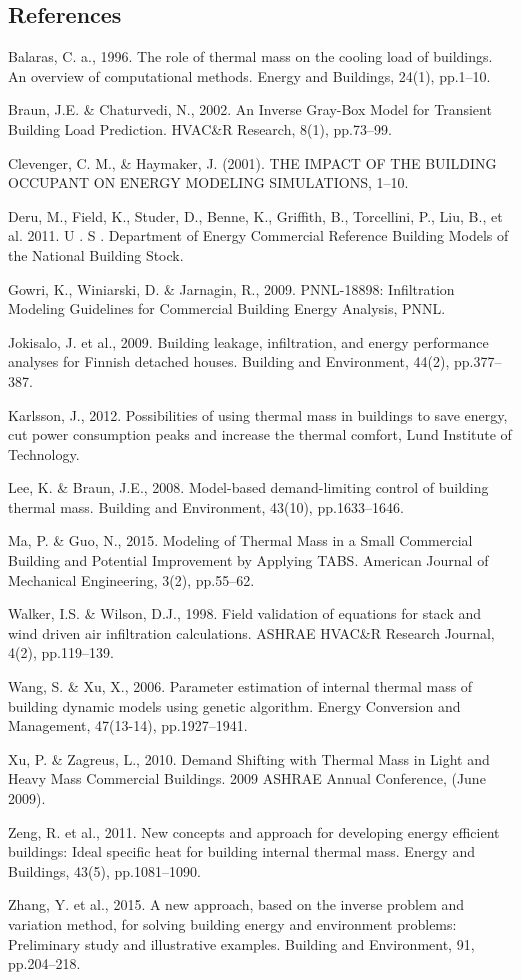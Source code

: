 \subsection{References}\label{references}

Balaras, C. a., 1996. The role of thermal mass on the cooling load of buildings. An overview of computational methods. Energy and Buildings, 24(1), pp.1–10.

Braun, J.E. \& Chaturvedi, N., 2002. An Inverse Gray-Box Model for Transient Building Load Prediction. HVAC\&R Research, 8(1), pp.73–99.

Clevenger, C. M., \& Haymaker, J. (2001). THE IMPACT OF THE BUILDING OCCUPANT ON ENERGY MODELING SIMULATIONS, 1–10.

Deru, M., Field, K., Studer, D., Benne, K., Griffith, B., Torcellini, P., Liu, B., et al. 2011. U . S . Department of Energy Commercial Reference Building Models of the National Building Stock.

Gowri, K., Winiarski, D. \& Jarnagin, R., 2009. PNNL-18898: Infiltration Modeling Guidelines for Commercial Building Energy Analysis, PNNL.

Jokisalo, J. et al., 2009. Building leakage, infiltration, and energy performance analyses for Finnish detached houses. Building and Environment, 44(2), pp.377–387.

Karlsson, J., 2012. Possibilities of using thermal mass in buildings to save energy, cut power consumption peaks and increase the thermal comfort, Lund Institute of Technology.

Lee, K. \& Braun, J.E., 2008. Model-based demand-limiting control of building thermal mass. Building and Environment, 43(10), pp.1633–1646.

Ma, P. \& Guo, N., 2015. Modeling of Thermal Mass in a Small Commercial Building and Potential Improvement by Applying TABS. American Journal of Mechanical Engineering, 3(2), pp.55–62.

Walker, I.S. \& Wilson, D.J., 1998. Field validation of equations for stack and wind driven air infiltration calculations. ASHRAE HVAC\&R Research Journal, 4(2), pp.119–139.

Wang, S. \& Xu, X., 2006. Parameter estimation of internal thermal mass of building dynamic models using genetic algorithm. Energy Conversion and Management, 47(13-14), pp.1927–1941.

Xu, P. \& Zagreus, L., 2010. Demand Shifting with Thermal Mass in Light and Heavy Mass Commercial Buildings. 2009 ASHRAE Annual Conference, (June 2009).

Zeng, R. et al., 2011. New concepts and approach for developing energy efficient buildings: Ideal specific heat for building internal thermal mass. Energy and Buildings, 43(5), pp.1081–1090.

Zhang, Y. et al., 2015. A new approach, based on the inverse problem and variation method, for solving building energy and environment problems: Preliminary study and illustrative examples. Building and Environment, 91, pp.204–218.

